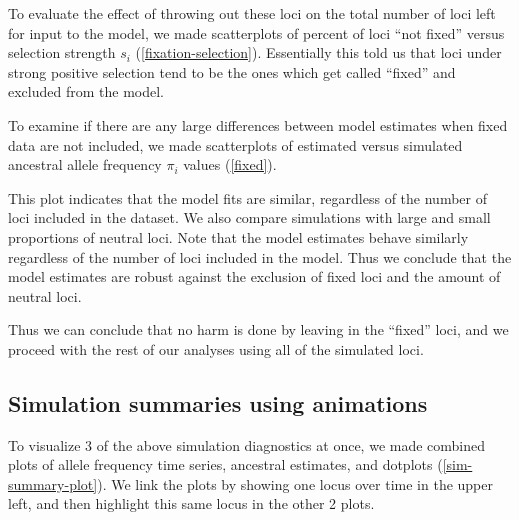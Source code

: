\documentclass[a4paper,12pt]{article}
\begin{document}
To evaluate the effect of throwing out these loci on the total number
of loci left for input to the model, we made scatterplots of percent
of loci ``not fixed'' versus selection strength $s_i$
(\autoref{fixation-selection}). Essentially this told us that loci
under strong positive selection tend to be the ones which get called
``fixed'' and excluded from the model.


To examine if there are any large differences between model estimates
when fixed data are not included, we made scatterplots of estimated
versus simulated ancestral allele frequency $\pi_i$ values
(\autoref{fixed}).


This plot indicates that the model fits are similar, regardless of the
number of loci included in the dataset. We also compare simulations
with large and small proportions of neutral loci. Note that the model
estimates behave similarly regardless of the number of loci included
in the model. Thus we conclude that the model estimates are robust
against the exclusion of fixed loci and the amount of neutral loci.

Thus we can conclude that no harm is done by leaving in the ``fixed''
loci, and we proceed with the rest of our analyses using all of the
simulated loci.

\subsection{Simulation summaries using animations}

To visualize 3 of the above simulation diagnostics at once, we made
combined plots of allele frequency time series, ancestral estimates,
and dotplots (\autoref{sim-summary-plot}). We link the plots by
showing one locus over time in the upper left, and then highlight this
same locus in the other 2 plots.

\end{document}
